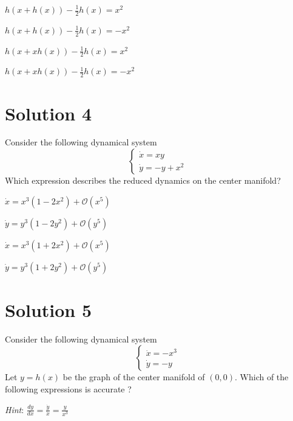 \documentclass[twoside,10pt,a4paper]{article}
\begin{document}
\begin{enumerate}[label=(\alph*)]
	\item $ \displaystyle h(x + h(x)) - \frac{1}{2}h(x) = x^2 $
	\item $ \displaystyle h(x + h(x)) - \frac{1}{2}h(x) = -x^2 $
	\item $ \displaystyle h(x + xh(x)) - \frac{1}{2}h(x) = x^2 $
	{\color{MyRed}\item $ \displaystyle h(x + xh(x)) - \frac{1}{2}h(x) = -x^2 $}
\end{enumerate}

\section*{Solution 4}
Consider the following dynamical system
\begin{equation*}
	\begin{cases}
		\dot{x} = xy \\
		\dot{y} = -y + x^2
	\end{cases}
\end{equation*}
Which expression describes the reduced dynamics on the center manifold?

\begin{enumerate}[label=(\alph*)]
	{\color{MyRed}\item $ \dot{x} = x^3(1 - 2x^2) + \mathcal{O}(x^5) $}
	\item $ \dot{y} = y^3(1 - 2y^2) + \mathcal{O}(y^5) $
	\item $ \dot{x} = x^3(1 + 2x^2) + \mathcal{O}(x^5) $
	\item $ \dot{y} = y^3(1 + 2y^2) + \mathcal{O}(y^5) $
\end{enumerate}

\section*{Solution 5}
Consider the following dynamical system
\begin{equation*}
	\begin{cases}
		\dot{x} = -x^3 \\
		\dot{y} = -y
	\end{cases}
\end{equation*}
Let $y = h(x)$ be the graph of the center manifold of $(0,0)$. Which of the following expressions is accurate ?

\textit{Hint}: $ \displaystyle \frac{dy}{dx} = \frac{\dot{y}}{\dot{x}} = \frac{y}{x^3} $
\end{document}
